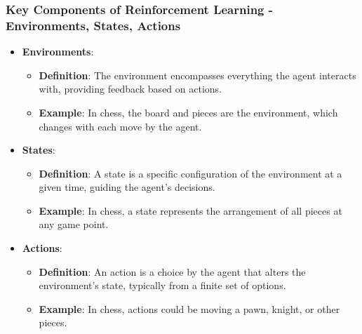 \documentclass[aspectratio=169]{beamer}
\begin{document}
\begin{frame}[fragile]
  \frametitle{Key Components of Reinforcement Learning - Environments, States, Actions}
  \begin{itemize}
    \item \textbf{Environments}:
    \begin{itemize}
      \item \textbf{Definition}: The environment encompasses everything the agent interacts with, providing feedback based on actions.
      \item \textbf{Example}: In chess, the board and pieces are the environment, which changes with each move by the agent.
    \end{itemize}

    \item \textbf{States}:
    \begin{itemize}
      \item \textbf{Definition}: A state is a specific configuration of the environment at a given time, guiding the agent's decisions.
      \item \textbf{Example}: In chess, a state represents the arrangement of all pieces at any game point.
    \end{itemize}

    \item \textbf{Actions}:
    \begin{itemize}
      \item \textbf{Definition}: An action is a choice by the agent that alters the environment's state, typically from a finite set of options.
      \item \textbf{Example}: In chess, actions could be moving a pawn, knight, or other pieces.
    \end{itemize}
  \end{itemize}
\end{frame}
\end{document}
